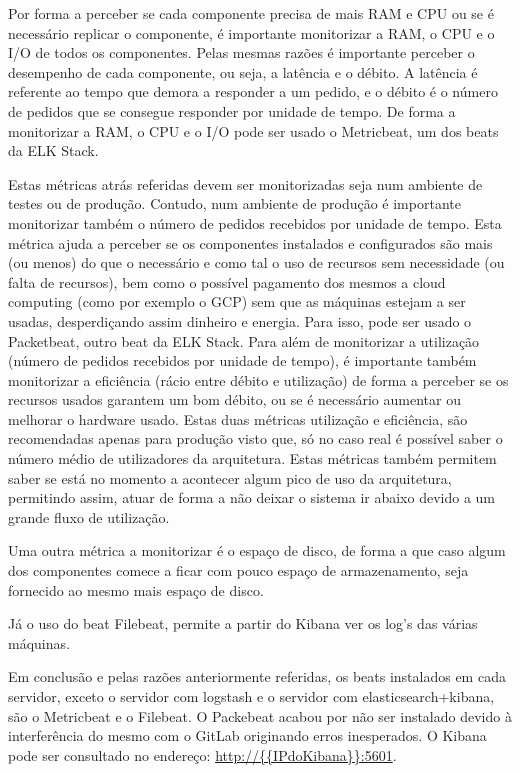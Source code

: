 \documentclass{article}
\begin{document}
Por forma a perceber se cada componente precisa de mais RAM e CPU ou se é necessário replicar o componente, é importante monitorizar a RAM, o CPU e o I/O de todos os componentes. Pelas mesmas razões é importante perceber o desempenho de cada componente, ou seja, a latência e o débito. A latência é referente ao tempo que demora a responder a um pedido, e o débito é o número de pedidos que se consegue responder por unidade de tempo. De forma a monitorizar a RAM, o CPU e o I/O pode ser usado o Metricbeat, um dos beats da ELK Stack.

Estas métricas atrás referidas devem ser monitorizadas seja num ambiente de testes ou de produção. Contudo, num ambiente de produção é importante monitorizar também o número de pedidos recebidos por unidade de tempo. Esta métrica ajuda a perceber se os componentes instalados e configurados são mais (ou menos) do que o necessário e como tal o uso de recursos sem necessidade (ou falta de recursos), bem como o possível pagamento dos mesmos a cloud computing (como por exemplo o GCP) sem que as máquinas estejam a ser usadas, desperdiçando assim dinheiro e energia. Para isso, pode ser usado o Packetbeat, outro beat da ELK Stack. Para além de monitorizar a utilização (número de pedidos recebidos por unidade de tempo), é importante também monitorizar a eficiência (rácio entre débito e utilização) de forma a perceber se os recursos usados garantem um bom débito, ou se é necessário aumentar ou melhorar o hardware usado. Estas duas métricas utilização e eficiência, são recomendadas apenas para produção visto que, só no caso real é possível saber o número médio de utilizadores da arquitetura. Estas métricas também permitem saber se está no momento a acontecer algum pico de uso da arquitetura, permitindo assim, atuar de forma a não deixar o sistema ir abaixo devido a um grande fluxo de utilização.

Uma outra métrica a monitorizar é o espaço de disco, de forma a que caso algum dos componentes comece a ficar com pouco espaço de armazenamento, seja fornecido ao mesmo mais espaço de disco.

Já o uso do beat Filebeat, permite a partir do Kibana ver os log's das várias máquinas.

Em conclusão e pelas razões anteriormente referidas, os beats instalados em cada servidor, exceto o servidor com logstash e o servidor com elasticsearch+kibana, são o Metricbeat e o Filebeat. O Packebeat acabou por não ser instalado devido à interferência do mesmo com o GitLab originando erros inesperados. O Kibana pode ser consultado no endereço: \url{http://{{IPdoKibana}}:5601}.
\end{document}
